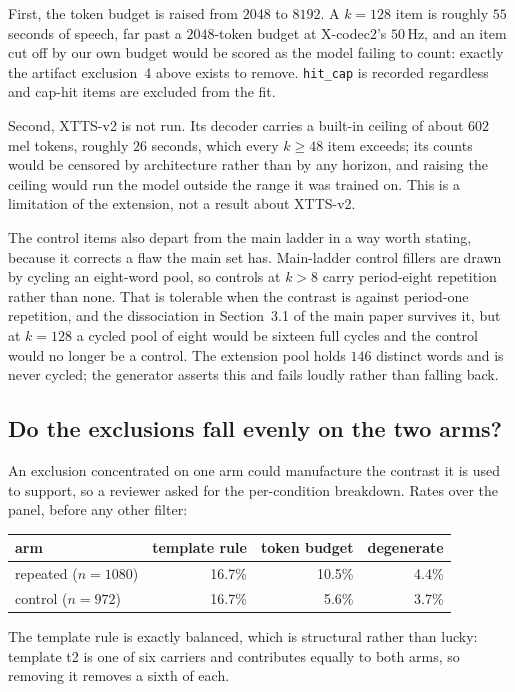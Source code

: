 \documentclass[11pt]{article}
\begin{document}
First, the token budget is raised from $2048$ to $8192$. A $k\!=\!128$ item is
roughly $55$ seconds of speech, far past a $2048$-token budget at X-codec2's
$50$\,Hz, and an item cut off by our own budget would be scored as the model
failing to count: exactly the artifact exclusion~4 above exists to remove.
\texttt{hit\_cap} is recorded regardless and cap-hit items are excluded from the
fit.

Second, XTTS-v2 is not run. Its decoder carries a built-in ceiling of about
$602$ mel tokens, roughly $26$ seconds, which every $k\ge48$ item exceeds; its
counts would be censored by architecture rather than by any horizon, and raising
the ceiling would run the model outside the range it was trained on. This is a
limitation of the extension, not a result about XTTS-v2.

The control items also depart from the main ladder in a way worth stating,
because it corrects a flaw the main set has. Main-ladder control fillers are
drawn by cycling an eight-word pool, so controls at $k>8$ carry period-eight
repetition rather than none. That is tolerable when the contrast is against period-one
repetition, and the dissociation in Section~3.1 of the main paper survives it, but
at $k=128$ a cycled pool of eight would be sixteen full cycles and the control
would no longer be a control. The extension pool holds $146$ distinct words and
is never cycled; the generator asserts this and fails loudly rather than falling
back.


\subsection{Do the exclusions fall evenly on the two arms?}

An exclusion concentrated on one arm could manufacture the contrast it is used to
support, so a reviewer asked for the per-condition breakdown. Rates over the
panel, before any other filter:

\begin{center}
\begin{tabular}{lrrr}
\toprule
arm & template rule & token budget & degenerate \\
\midrule
repeated ($n=1080$) & 16.7\% & 10.5\% & 4.4\% \\
control ($n=972$)   & 16.7\% & 5.6\%  & 3.7\% \\
\bottomrule
\end{tabular}
\end{center}

The template rule is exactly balanced, which is structural rather than lucky:
template t2 is one of six carriers and contributes equally to both arms, so
removing it removes a sixth of each.
\end{document}
